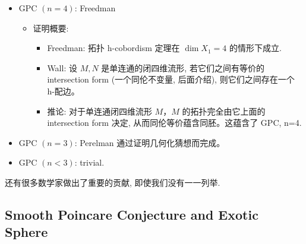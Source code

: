 \documentclass[
]{ctexart}
\providecommand{\tightlist}{%
  \setlength{\itemsep}{0pt}\setlength{\parskip}{0pt}}
\begin{document}
\begin{itemize}
\begin{itemize}
    \begin{itemize}
    \tightlist
    \item
      key word: Engulfing method (吞噬法)
    \end{itemize}
  \item
    GPC \(\left(n=4\right)\): Freedman

    \begin{itemize}
    \tightlist
    \item
      证明概要:

      \begin{itemize}
      \tightlist
      \item
        Freedman: 拓扑 h-cobordism 定理在 \(\dim X_1=4\) 的情形下成立.
      \item
        Wall: 设 \(M,N\) 是单连通的闭四维流形, 若它们之间有等价的
        intersection form (一个同伦不变量, 后面介绍), 则它们之间存在一个
        h-配边。
      \item
        推论: 对于单连通闭四维流形 \(M\)，\(M\) 的拓扑完全由它上面的
        intersection form 决定, 从而同伦等价蕴含同胚。这蕴含了 GPC, n=4.
      \end{itemize}
    \end{itemize}
  \item
    GPC \(\left(n=3\right)\): Perelman 通过证明几何化猜想而完成。
  \item
    GPC \(\left(n<3\right)\): trivial.
  \end{itemize}
\end{itemize}

还有很多数学家做出了重要的贡献, 即使我们没有一一列举.

\subsection{Smooth Poincare Conjecture and Exotic
Sphere}\label{smooth-poincare-conjecture-and-exotic-sphere}
\end{document}

